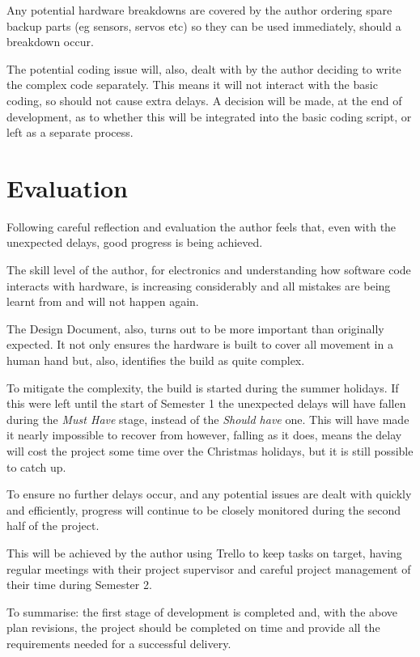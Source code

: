 \documentclass[progress]{cmpreport}
\begin{document}
{{{{{{Any potential hardware breakdowns are covered by the author ordering spare backup parts (eg sensors, servos etc) so they can be used immediately, should a breakdown occur. 

The potential coding issue will, also, dealt with by the author deciding to write the complex code separately. This means it will not interact with the basic coding, so should not cause extra delays. A decision will be made, at the end of development, as to whether this will be integrated into the basic coding script, or left as a separate process.


\section{Evaluation}
Following careful reflection and evaluation the author feels that, even with the unexpected delays, good progress is being achieved. 

The skill level of the author, for electronics and understanding how software code interacts with hardware, is increasing considerably and all mistakes are being learnt from and will not happen again.

The Design Document, also, turns out to be more important than originally expected. It not only ensures the hardware is built to cover all movement in a human hand but, also, identifies the build as quite complex. 

To mitigate the complexity, the build is started during the summer holidays. If this were left until the start of Semester 1 the unexpected delays will have fallen during the \textit{Must Have} stage, instead of the \textit{Should have} one. This will have made it nearly impossible to recover from however, falling as it does, means the delay will cost the project some time over the Christmas holidays, but it is still possible to catch up.

To ensure no further delays occur, and any potential issues are dealt with quickly and efficiently, progress will continue to be closely monitored during the second half of the project. 

This will be achieved by the author using Trello to keep tasks on target, having regular meetings with their project supervisor and careful project management of their time during Semester 2.

To summarise: the first stage of development is completed and, with the above plan revisions, the project should be completed on time and provide all the requirements needed for a successful delivery.

}}}}}}
\end{document}
